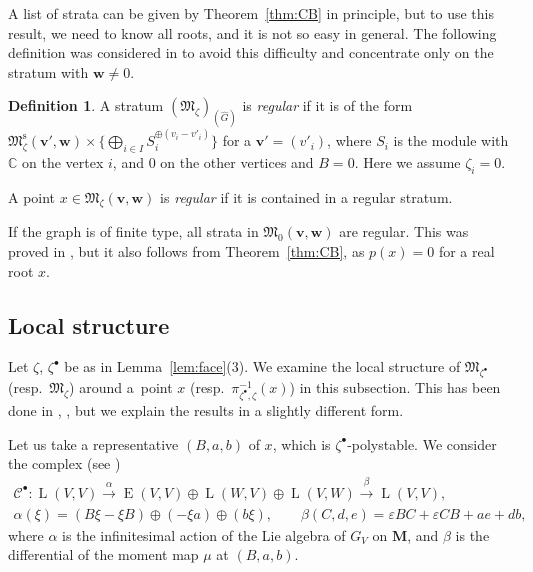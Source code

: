 \documentclass[pdftex]{sigma}
\theoremstyle{definition}
\newtheorem{Definition}[equation]{Definition}
\numberwithin{equation}{section}
\newcommand{\thmref}[1]{Theorem~\ref{#1}}
\newcommand{\lemref}[1]{Lemma~\ref{#1}}
\newcommand{\C}{{\mathbb C}}
\newcommand{\bM}{{\mathbf M}} %
\newcommand{\M}{{\mathfrak M}} %
\newcommand{\Mreg}{\M^{\operatorname{s}}}
\newcommand{\bv}{{\mathbf v}} %
\newcommand{\bw}{{\mathbf w}} %
\newcommand{\HomE}{\operatorname{E}}
\newcommand{\HomL}{\operatorname{L}}
\begin{document}
A list of strata can be given by \thmref{thm:CB} in principle, but to
use this result, we need to know all roots, and it is not so easy in
general.
%
The following def\/inition was considered in \cite[2.6.4]{Na-qaff} to
avoid this dif\/f\/iculty and concentrate only on the stratum with $\bw
\neq 0$.

\begin{Definition}
  A stratum $(\M_\zeta)_{(\widehat G)}$ is {\it regular\/} if it is of
  the form $\Mreg_\zeta(\bv',\bw)\times\{ \bigoplus_{i\in I}
  S_i^{\oplus (v_i - v'_i)}\}$ for a $\bv' = (v'_i)$, where $S_i$ is
  the module with $\C$ on the vertex $i$, and $0$ on the other
  vertices and $B = 0$. Here we assume $\zeta_i = 0$.

  A point $x\in\M_\zeta(\bv,\bw)$ is {\it regular\/} if it is contained in
  a regular stratum.
\end{Definition}

If the graph is of f\/inite type, all strata in $\M_0(\bv,\bw)$ are
regular. This was proved in \cite[6.7]{Na-quiver}, but it also follows
from \thmref{thm:CB}, as $p(x) = 0$ for a real root $x$.

\subsection{Local structure}\label{subsec:local}

Let $\zeta$, $\zeta^\bullet$ be as in \lemref{lem:face}(3).
%
We examine the local structure of $\M_{\zeta^\bullet}$ (resp.\ $\M_{\zeta}$)
around a~point $x$ (resp.\ $\pi_{\zeta^\bullet,\zeta}^{-1}(x)$) in this
subsection. This has been done in \cite[Section~6]{Na-quiver},
\cite[Section~3.2]{Na-qaff}, but we explain the results in a slightly
dif\/ferent form.

Let us take a representative $(B,a,b)$ of $x$, which is
$\zeta^\bullet$-polystable. We consider the complex (see
\cite[(3.11)]{Na-alg})
\begin{gather}
   \mathscr{C}^\bullet :
   \HomL(V,V) \xrightarrow{\alpha}
   \HomE(V,V)\oplus\HomL(W,V) \oplus \HomL(V,W) \xrightarrow{\beta}
   \HomL(V,V),
\nonumber\\
   \alpha(\xi) = (B\xi-\xi B)\oplus (-\xi a) \oplus (b\xi), \qquad
   \beta(C,d,e) = \varepsilon B C + \varepsilon C B + a e + d b,\label{eq:tancpx}
\end{gather}
where $\alpha$ is the inf\/initesimal action of the Lie algebra of $G_V$
on $\bM$, and $\beta$ is the dif\/ferential of the moment map $\mu$ at
$(B,a,b)$.
\end{document}
